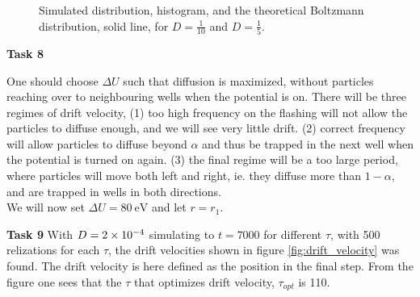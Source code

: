 \documentclass[a4paper, 12pt]{article}
\begin{document}
\begin{figure}[h]
  \centering
  \caption{Simulated distribution, histogram, and the theoretical Boltzmann distribution, solid line, for $D=\frac{1}{10}$ and $D=\frac{1}{5}$.}
\end{figure}

\textbf{Task 8}

One should choose $\Delta U$ such that diffusion is maximized, without particles reaching over to neighbouring wells when the potential is on.
There will be three regimes of drift velocity, (1) too high frequency on the flashing will not allow the particles to diffuse enough, and we will see very little drift. (2) correct frequency will allow particles to diffuse beyond $\alpha$ and thus be trapped in the next well when the potential is turned on again. (3) the final regime will be a too large period, where particles will move both left and right, ie. they diffuse more than $1-\alpha$, and are trapped in wells in both directions.\\

We will now set $\Delta U = \SI{80}{\eV}$ and let $r = r_1$.


\textbf{Task 9}
With $D=\num{2E-4}$ simulating to $t=7000$ for different $\tau$, with 500 relizations for each $\tau$, the drift velocities shown in figure \ref{fig:drift_velocity} was found.
The drift velocity is here defined as the position in the final step.
From the figure one sees that the $\tau$ that optimizes drift velocity, $\tau_{opt}$ is 110.
\end{document}
